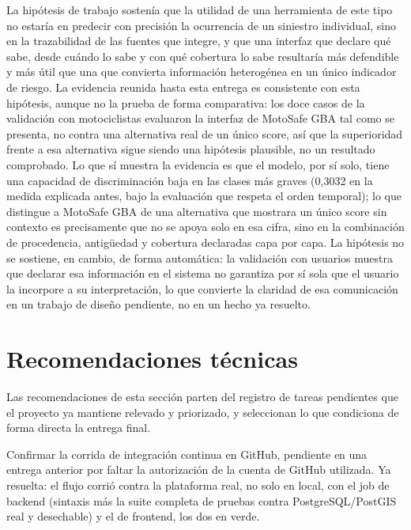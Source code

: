 La hipótesis de trabajo sostenía que la utilidad de una herramienta de
este tipo no estaría en predecir con precisión la ocurrencia de un
siniestro individual, sino en la trazabilidad de las fuentes que
integre, y que una interfaz que declare qué sabe, desde cuándo lo sabe y
con qué cobertura lo sabe resultaría más defendible y más útil que una
que convierta información heterogénea en un único indicador de riesgo.
La evidencia reunida hasta esta entrega es consistente con esta
hipótesis, aunque no la prueba de forma comparativa: los doce casos de
la validación con motociclistas evaluaron la interfaz de MotoSafe GBA
tal como se presenta, no contra una alternativa real de un único score,
así que la superioridad frente a esa alternativa sigue siendo una
hipótesis plausible, no un resultado comprobado. Lo que sí muestra la
evidencia es que el modelo, por sí solo, tiene una capacidad de
discriminación baja en las clases más graves (0,3032 en la medida
explicada antes, bajo la evaluación que respeta el orden temporal); lo
que distingue a MotoSafe GBA de una alternativa que mostrara un único
score sin contexto es precisamente que no se apoya solo en esa cifra,
sino en la combinación de procedencia, antigüedad y cobertura declaradas
capa por capa. La hipótesis no se sostiene, en cambio, de forma
automática: la validación con usuarios muestra que declarar esa
información en el sistema no garantiza por sí sola que el usuario la
incorpore a su interpretación, lo que convierte la claridad de esa
comunicación en un trabajo de diseño pendiente, no en un hecho ya
resuelto.

\section{Recomendaciones técnicas}

Las recomendaciones de esta sección parten del registro de tareas
pendientes que el proyecto ya mantiene relevado y priorizado, y
seleccionan lo que condiciona de forma directa la entrega final.

Confirmar la corrida de integración continua en GitHub, pendiente en una
entrega anterior por faltar la autorización de la cuenta de GitHub
utilizada. Ya resuelta: el flujo corrió contra la plataforma real, no
solo en local, con el job de backend (sintaxis más la suite completa de
pruebas contra PostgreSQL/PostGIS real y desechable) y el de frontend,
los dos en verde.

